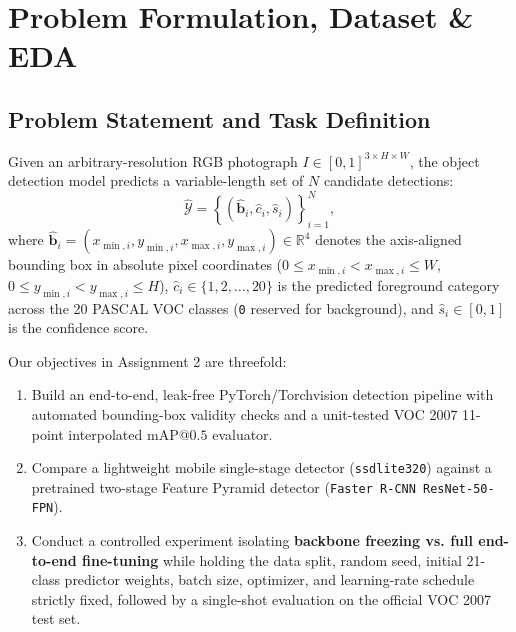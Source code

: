 \documentclass[twoside,final]{hcmut-report}
\begin{document}
\clearpage
\tableofcontents

\clearpage
\section{Problem Formulation, Dataset \& EDA}

\subsection{\textbf{Problem Statement and Task Definition}}
Given an arbitrary-resolution RGB photograph $I \in [0, 1]^{3 \times H \times W}$, the object detection model predicts a variable-length set of $N$ candidate detections:
\[
\hat{\mathcal{Y}} = \left\{ \left(\hat{\mathbf{b}}_i, \hat{c}_i, \hat{s}_i\right) \right\}_{i=1}^{N},
\]
where $\hat{\mathbf{b}}_i = (x_{\min,i}, y_{\min,i}, x_{\max,i}, y_{\max,i}) \in \mathbb{R}^4$ denotes the axis-aligned bounding box in absolute pixel coordinates ($0 \le x_{\min,i} < x_{\max,i} \le W$, $0 \le y_{\min,i} < y_{\max,i} \le H$), $\hat{c}_i \in \{1, 2, \dots, 20\}$ is the predicted foreground category across the 20 PASCAL VOC classes (\texttt{0} reserved for background), and $\hat{s}_i \in [0, 1]$ is the confidence score.

Our objectives in Assignment 2 are threefold:
\begin{enumerate}
    \item Build an end-to-end, leak-free PyTorch/Torchvision detection pipeline with automated bounding-box validity checks and a unit-tested VOC 2007 11-point interpolated $\text{mAP}@0.5$ evaluator.
    \item Compare a lightweight mobile single-stage detector (\texttt{ssdlite320}) against a pretrained two-stage Feature Pyramid detector (\texttt{Faster R-CNN ResNet-50-FPN}).
    \item Conduct a controlled experiment isolating \textbf{backbone freezing vs. full end-to-end fine-tuning} while holding the data split, random seed, initial 21-class predictor weights, batch size, optimizer, and learning-rate schedule strictly fixed, followed by a single-shot evaluation on the official VOC 2007 test set.
\end{enumerate}
\end{document}
